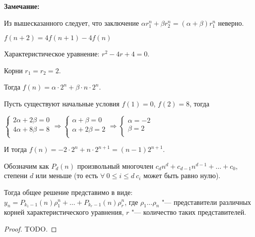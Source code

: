 \textbf{Замечание:}

Из вышесказанного следует, что заключение $\alpha r_1^n + \beta r_2^n = (\alpha + \beta) r_1^n$ неверно.

\begin{example}
    $f(n + 2) = 4f(n + 1) - 4f(n)$

    Характеристическое уравнение: $r^2 - 4r + 4 = 0$.

    Корни $r_1 = r_2 = 2$.

    Тогда $f(n) = \alpha \cdot 2^n + \beta \cdot n \cdot 2^n$.

    Пусть существуют начальные условия $f(1) = 0$, $f(2) = 8$, тогда

    $\displaystyle \begin{cases}
        2\alpha + 2\beta = 0 \\
        4\alpha + 8 \beta = 8 \\
    \end{cases} \Longrightarrow 
    \begin{cases}
        \alpha + \beta = 0 \\
        \alpha + 2\beta = 2 \\
    \end{cases} \Longrightarrow
    \begin{cases}
        \alpha = -2 \\ 
        \beta = 2 \\
    \end{cases}$ 

    И тогда $f(n) = -2 \cdot 2^n + n \cdot 2^{n + 1} = (n - 1)2^{n + 1}$.
\end{example}

\begin{theorem}[Общее решение однородных линейных рекуррентных соотношений $k$"=ого порядка]
    Обозначим как $P_d(n)$ произвольный многочлен
    $c_d n^d + c_{d - 1} n^{d - 1} + \dots + c_0$, 
    степени $d$ или меньше (то есть $\forall~ 0 \leq i \leq d ~c_i$ может быть равно нулю).

    Тогда общее решение представимо в виде: $y_n = P_{k_1 - 1}(n) \rho_1^n +
    \dots + P_{k_r - 1}(n) \rho_r^n$, где $\rho_1 \dots \rho_n$ "--- представители
    различных корней характеристического уравнения, $r$ "--- количество
    таких представителей.

    \begin{proof}
        TODO.
    \end{proof}
\end{theorem}

